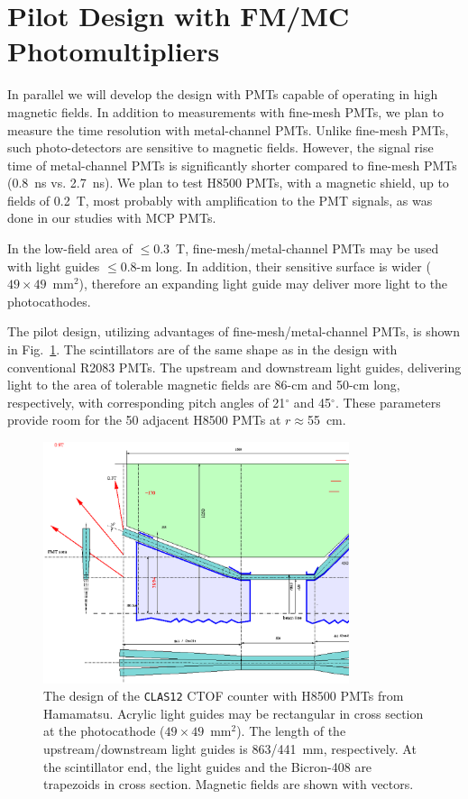 \section{Pilot Design with FM/MC Photomultipliers}

In parallel we will develop the design with PMTs capable of operating in high  
magnetic fields.  In addition to measurements with fine-mesh PMTs, we plan  
to measure the time resolution with metal-channel PMTs.  Unlike fine-mesh 
PMTs, such photo-detectors are sensitive to magnetic fields.  However, the 
signal rise time of metal-channel PMTs is significantly shorter compared to 
fine-mesh PMTs (0.8~ns vs. 2.7~ns).  We plan to test H8500 PMTs, with a magnetic 
shield, up to fields of 0.2~T, most probably with amplification to the PMT signals, 
as was done in our studies with MCP PMTs.

In the low-field area of $\leq$0.3~T, fine-mesh/metal-channel PMTs may be used 
with light guides $\leq$0.8-m long.  In addition, their sensitive surface is 
wider ($49\times49$~mm$^2$), therefore an expanding light guide may deliver 
more light to the photocathodes.  

The pilot design, utilizing advantages of fine-mesh/metal-channel PMTs, is 
shown in Fig.~\ref{JLABt0H8500}.  The scintillators are of the same shape 
as in the design with conventional R2083 PMTs.  The upstream and downstream 
light guides, delivering light to the area of tolerable magnetic fields  
are 86-cm and 50-cm long, respectively, with corresponding pitch angles of  
21$^\circ$ and 45$^\circ$.  These parameters provide room for the 50 adjacent 
H8500 PMTs at $r\approx$55~cm.

\begin{figure} [htbp]
\centering
\includegraphics[width=0.8\textwidth]{JLABt0H8500.ps}
\caption{\small{The design of the {\tt CLAS12} CTOF counter with H8500 
PMTs from Hamamatsu.  Acrylic light guides may be rectangular in cross 
section at the photocathode ($49\times49$~mm$^2$). The length of the 
upstream/downstream light guides is 863/441~mm, respectively.  At the 
scintillator end, the light guides and the Bicron-408 are trapezoids in 
cross section.  Magnetic fields are shown with vectors.}}
\label{JLABt0H8500}
\end{figure}

